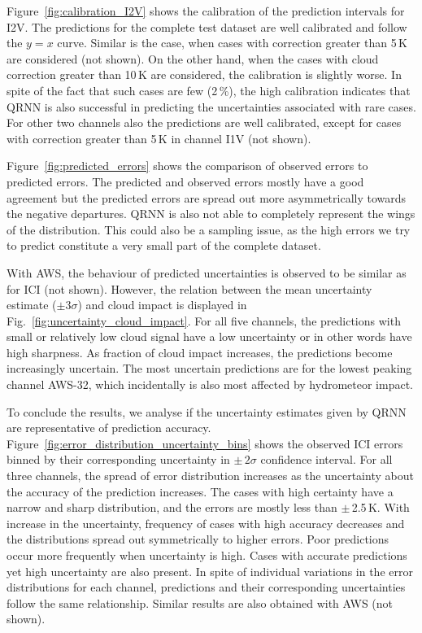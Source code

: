 \documentclass[amt, manuscript]{copernicus}
\begin{document}
Figure~\ref{fig:calibration_I2V} shows the calibration of the prediction intervals for I2V. The predictions for the complete test dataset are well calibrated and follow the $y =x$ curve. Similar is the case, when cases with correction greater than 5\,K are considered (not shown). On the other hand, when  the cases with cloud correction greater than 10\,K are considered, the calibration is  slightly worse. In spite of the fact that such cases are few (2\,\%), the high calibration indicates that QRNN is also successful in predicting the uncertainties associated with rare cases. For other two channels also the predictions are well calibrated, except for cases with correction greater than 5\,K in channel I1V (not shown). 

Figure~\ref{fig:predicted_errors} shows the comparison of observed errors to predicted errors. The predicted and observed errors mostly have a good agreement but the predicted errors are spread out more asymmetrically towards the negative departures. QRNN is also not able to completely represent the wings of the distribution. This could also be a sampling issue, as the high errors we try to predict constitute a very small part of the complete dataset. 

With AWS, the behaviour of predicted uncertainties is observed to be similar as for ICI (not shown). However, the relation between the mean uncertainty estimate ($\pm3\sigma$) and cloud impact is displayed in Fig.~\ref{fig:uncertainty_cloud_impact}. For all five channels, the predictions with small or relatively low cloud signal have a low uncertainty or in other words have high sharpness. As fraction of cloud impact increases, the predictions become increasingly uncertain. The most uncertain predictions are for the lowest peaking channel AWS-32, which incidentally is also most affected by  hydrometeor impact.  

To conclude the results, we analyse if the uncertainty estimates given by QRNN are representative of prediction accuracy. Figure~\ref{fig:error_distribution_uncertainty_bins} shows the observed ICI errors binned by their corresponding uncertainty in $\pm\,2\sigma$  confidence interval. For all three channels, the spread of error distribution increases as the uncertainty about the accuracy of the prediction increases. The cases with high certainty have a narrow and sharp distribution, and the errors are mostly less than $\pm\,$2.5\,K. With increase in the uncertainty, frequency of cases with high accuracy decreases and the distributions spread out symmetrically to higher errors. Poor predictions occur more frequently when uncertainty is high. Cases with accurate predictions yet high uncertainty are also present. In spite of individual variations in the error distributions for each channel, predictions and their corresponding uncertainties follow the same relationship. Similar results are also obtained with AWS (not shown). 
\end{document}
